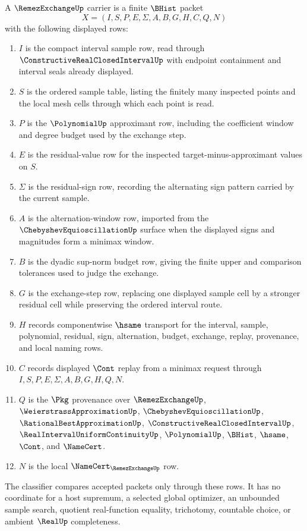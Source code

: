 \begin{definition}
\label{def:remez-exchange-carrier}
A $\RemezExchangeUp$ carrier is a finite $\BHist$ packet
$$
X=(I,S,P,E,\Sigma,A,B,G,H,C,Q,N)
$$
with the following displayed rows:
\begin{enumerate}
\item $I$ is the compact interval sample row, read through $\ConstructiveRealClosedIntervalUp$ with endpoint containment and interval seals already displayed.
\item $S$ is the ordered sample table, listing the finitely many inspected points and the local mesh cells through which each point is read.
\item $P$ is the $\PolynomialUp$ approximant row, including the coefficient window and degree budget used by the exchange step.
\item $E$ is the residual-value row for the inspected target-minus-approximant values on $S$.
\item $\Sigma$ is the residual-sign row, recording the alternating sign pattern carried by the current sample.
\item $A$ is the alternation-window row, imported from the $\ChebyshevEquioscillationUp$ surface when the displayed signs and magnitudes form a minimax window.
\item $B$ is the dyadic sup-norm budget row, giving the finite upper and comparison tolerances used to judge the exchange.
\item $G$ is the exchange-step row, replacing one displayed sample cell by a stronger residual cell while preserving the ordered interval route.
\item $H$ records componentwise $\hsame$ transport for the interval, sample, polynomial, residual, sign, alternation, budget, exchange, replay, provenance, and local naming rows.
\item $C$ records displayed $\Cont$ replay from a minimax request through $I,S,P,E,\Sigma,A,B,G,H,Q,N$.
\item $Q$ is the $\Pkg$ provenance over $\RemezExchangeUp$, $\WeierstrassApproximationUp$, $\ChebyshevEquioscillationUp$, $\RationalBestApproximationUp$, $\ConstructiveRealClosedIntervalUp$, $\RealIntervalUniformContinuityUp$, $\PolynomialUp$, $\BHist$, $\hsame$, $\Cont$, and $\NameCert$.
\item $N$ is the local $\NameCert_{\RemezExchangeUp}$ row.
\end{enumerate}
The classifier compares accepted packets only through these rows. It has no coordinate for a host supremum, a selected global optimizer, an unbounded sample search, quotient real-function equality, trichotomy, countable choice, or ambient $\RealUp$ completeness.
\end{definition}

